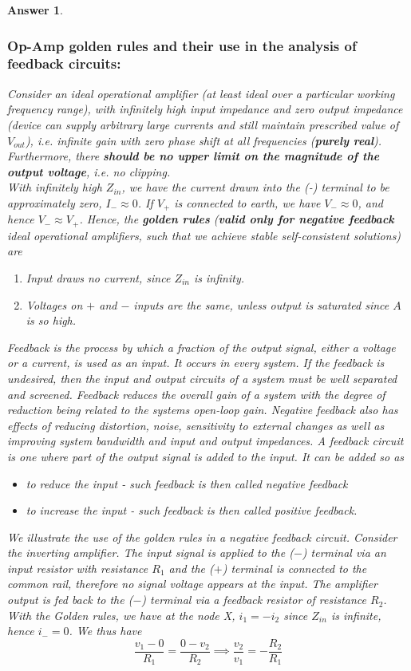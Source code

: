 \documentclass[a4paper]{article}
\newtheorem{ans}{Answer}[subsection]
\theoremstyle{new}
\begin{document}
\begin{ans}\leavevmode
\subsubsection*{Op-Amp golden rules and their use in the analysis of feedback circuits:}
Consider an ideal operational amplifier (at least ideal over a particular working frequency range), with infinitely high input impedance and zero output impedance (device can supply arbitrary large currents and still maintain prescribed value of $V_{out}$), i.e. infinite gain with zero phase shift at all frequencies (\textbf{purely real}). Furthermore, there \textbf{should be no upper limit on the magnitude of the output voltage}, i.e. no clipping.\\[5pt]
With infinitely high $Z_{in}$, we have the current drawn into the (-) terminal to be approximately zero, $I_-\approx 0$. If $V_+$ is connected to earth, we have $V_-\approx 0$, and hence $V_-\approx V_+$. Hence, the \textbf{golden rules} (\textbf{valid only for negative feedback} ideal operational amplifiers, such that we achieve stable self-consistent solutions) are
\begin{enumerate}
    \item Input draws no current, since $Z_{in}$ is infinity.
    \item Voltages on $+$ and $-$ inputs are the same, unless output is saturated since $A$ is so high.
\end{enumerate}
Feedback is the process by which a fraction of the output signal, either a voltage or a current, is used as an input. It occurs in every system. If the feedback is undesired, then the input and output circuits of a system must be well separated and screened. Feedback reduces the overall gain of a system with the degree of reduction being related to the systems open-loop gain. Negative feedback also has effects of reducing distortion, noise, sensitivity to external changes as well as improving system bandwidth and input and output impedances. A feedback circuit is one where part of the output signal is added to the input. It can be added so as
\begin{itemize}
    \item to reduce the input - such feedback is then called negative feedback
    \item to increase the input - such feedback is then called positive feedback.
\end{itemize}
We illustrate the use of the golden rules in a negative feedback circuit. Consider the inverting amplifier. The input signal is applied to the ($-$) terminal via an input resistor with resistance $R_1$ and the ($+$) terminal is connected to the common rail, therefore no signal voltage appears at the input. The amplifier output is fed back to the ($-$) terminal via a feedback resistor of resistance $R_2$. With the Golden rules, we have at the node X, $i_1=-i_2$ since $Z_{in}$ is infinite, hence $i_-=0$. We thus have $$\frac{v_1-0}{R_1}=\frac{0-v_2}{R_2}\implies\frac{v_2}{v_1}=-\frac{R_2}{R_1}$$
\newpage

\end{ans}
\end{document}
